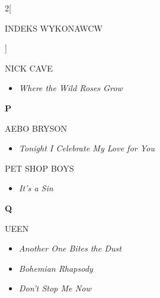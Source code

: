 \documentclass[a4paper]{report}
\begin{document}
\begin{multicols*}{2}[\begin{Huge}INDEKS WYKONAWCW\end{Huge}\vspace{1cm}]
\begin{minipage}{\columnwidth}
\end{minipage}
\begin{minipage}{\columnwidth}
	NICK CAVE 
	\begin{itemize}[topsep=3pt, after=\vspace{3mm}]
		\itemsep0em
		\item[]\textit{Where the Wild Roses Grow}  \\
	\end{itemize}
\end{minipage}
\begin{minipage}{\columnwidth}
	\begin{Large}\textbf{P}\end{Large}AEBO BRYSON 
	\begin{itemize}[topsep=3pt, after=\vspace{3mm}]
		\itemsep0em
		\item[]\textit{Tonight I Celebrate My Love for You}  \\
	\end{itemize}
\end{minipage}
\begin{minipage}{\columnwidth}
	PET SHOP BOYS 
	\begin{itemize}[topsep=3pt, after=\vspace{3mm}]
		\itemsep0em
		\item[]\textit{It's a Sin}  \\
	\end{itemize}
\end{minipage}
\begin{minipage}{\columnwidth}
	\begin{Large}\textbf{Q}\end{Large}UEEN 
	\begin{itemize}[topsep=3pt, after=\vspace{1.5mm}]
		\itemsep0em
		\item[]\textit{Another One Bites the Dust}  \\
		\item[]  \textit{Bohemian Rhapsody}  \\
	\end{itemize}
\end{minipage}
\begin{minipage}{\columnwidth}
	\begin{itemize}[topsep=3pt, after=\vspace{1.5mm}]
		\itemsep0em
		\item[]  \textit{Don't Stop Me Now}  \\

\end{itemize}
\end{minipage}
\end{multicols*}
\end{document}
